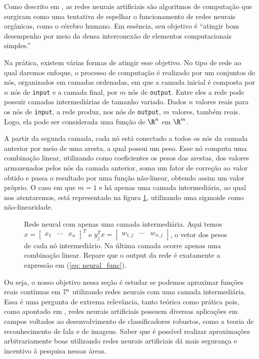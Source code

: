 Como descrito em \cite{lipmann}, as redes neurais artificiais são algoritmos de computação que surgiram como uma tentativa de espelhar o funcionamento de redes neurais orgânicas, como o cérebro humano.
Em essência, seu objetivo é ``atingir bom desempenho por meio da densa interconexão de elementos computacionais simples.''

Na prática, existem várias formas de atingir esse objetivo.
No tipo de rede ao qual daremos enfoque, o processo de computação é realizado por um conjuntos de nós, organizados em camadas ordenadas, em que a camada inicial é composta por \( n \) nós de \verb|input| e a camada final, por \( m \) nós de \verb|output|.
Entre eles a rede pode possuir camadas intermediárias de tamanho variado.
Dados \( n \) valores reais para os nós de \verb|input|, a rede produz, nos nós de \verb|output|, \( m \) valores, também reais.
Logo, ela pode ser considerada uma função de \( \R^{ n } \) em \( \R^{ m } \).

A partir da segunda camada, cada nó está conectado a todos os nós da camada anterior por meio de uma aresta, a qual possui um peso.
Esse nó computa uma combinação linear, utilizando como coeficientes os pesos das arestas, dos valores armazenados pelos nós da camada anterior, soma um fator de correção ao valor obtido e passa o resultado por uma função não-linear, obtendo assim um valor próprio.
O caso em que \( m = 1 \) e há apenas uma camada intermediária, ao qual nos atentaremos, está representado na figura \ref{fig: neural_net}, utilizando uma sigmoide como não-linearidade.

\begin{figure}[htb]
    \begin{center}
        
    \end{center}
    \caption{Rede neural com apenas uma camada intermediária.
    Aqui temos \( x =
    \begin{bmatrix}
        x_{ 1 } & \cdots & x_{ n }
    \end{bmatrix}^{ T } \) e \( y_{ j }^{ T }x =
    \begin{bmatrix}
        w_{ 1,j } & \cdots & w_{ n,j }
    \end{bmatrix} \), o vetor dos pesos de cada nó intermediário.
    Na última camada ocorre apenas uma combinação linear.
    Repare que o output da rede é exatamente a expressão em (\ref{eq: neural_func}).}
    \label{fig: neural_net}
\end{figure}

Ou seja, o nosso objetivo nessa seção é estudar se podemos aproximar funções reais contínuas em \( \mathbb{I}^{ n } \) utilizando redes neurais com uma camada intermediária.
Essa é uma pergunta de extrema relevância, tanto teórica como prática pois, como apontado em \cite{lipmann}, redes neurais artificiais possuem diversas aplicações em campos voltados ao desenvolvimento de classificadores robustos, como a teoria de reconhecimento de fala e de imagens.
Saber que é possível realizar aproximações arbitrariamente boas utilizando redes neurais artificiais dá mais segurança e incentivo à pesquisa nessas áreas.

